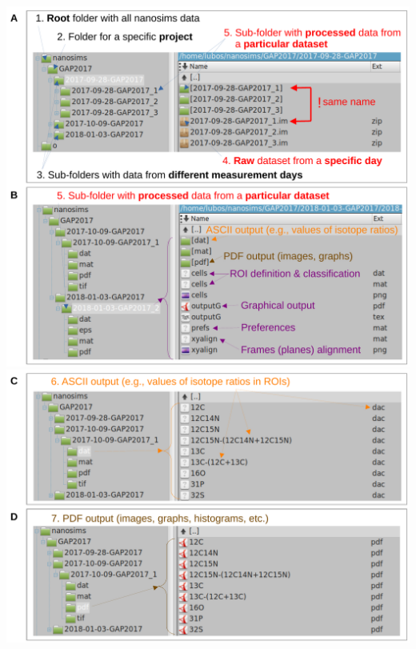 \newpage
\begin{center}
\includegraphics[scale=0.6]{figs2/folders_organizationAB}\\
\includegraphics[scale=0.6]{figs2/folders_organizationCD}
\end{center}